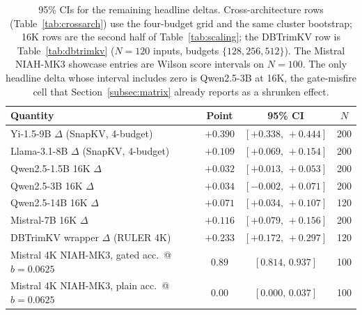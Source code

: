 \documentclass{article}
\begin{document}
\begin{table}[t]
\centering
\caption{95\% CIs for the remaining headline deltas. Cross-architecture rows
(Table~\ref{tab:crossarch}) use the four-budget grid and the same cluster
bootstrap; 16K rows are the second half of Table~\ref{tab:scaling}; the
DBTrimKV row is Table~\ref{tab:dbtrimkv} ($N = 120$ inputs, budgets
$\{128, 256, 512\}$). The Mistral NIAH-MK3 showcase entries are Wilson
score intervals on $N = 100$. The only headline delta whose interval
includes zero is Qwen2.5-3B at 16K, the gate-misfire cell that
Section~\ref{subsec:matrix} already reports as a shrunken effect.}
\label{tab:other-ci}
\begin{tabular}{lccc}
\toprule
Quantity & Point & 95\% CI & $N$ \\
\midrule
Yi-1.5-9B $\Delta$ (SnapKV, 4-budget)      & $+0.390$ & $[+0.338,\,+0.444]$ & 200 \\
Llama-3.1-8B $\Delta$ (SnapKV, 4-budget)   & $+0.109$ & $[+0.069,\,+0.154]$ & 200 \\
\midrule
Qwen2.5-1.5B 16K $\Delta$                  & $+0.032$ & $[+0.013,\,+0.053]$ & 200 \\
Qwen2.5-3B 16K $\Delta$                    & $+0.034$ & $[-0.002,\,+0.071]$ & 200 \\
Qwen2.5-14B 16K $\Delta$                   & $+0.071$ & $[+0.034,\,+0.107]$ & 120 \\
Mistral-7B 16K $\Delta$                    & $+0.116$ & $[+0.079,\,+0.156]$ & 200 \\
\midrule
DBTrimKV wrapper $\Delta$ (RULER 4K)       & $+0.233$ & $[+0.172,\,+0.297]$ & 120 \\
\midrule
Mistral 4K NIAH-MK3, gated acc.\ @ $b{=}0.0625$ & $0.89$ & $[0.814,\,0.937]$ & 100 \\
Mistral 4K NIAH-MK3, plain acc.\ @ $b{=}0.0625$ & $0.00$ & $[0.000,\,0.037]$ & 100 \\
\bottomrule
\end{tabular}
\end{table}
\end{document}
